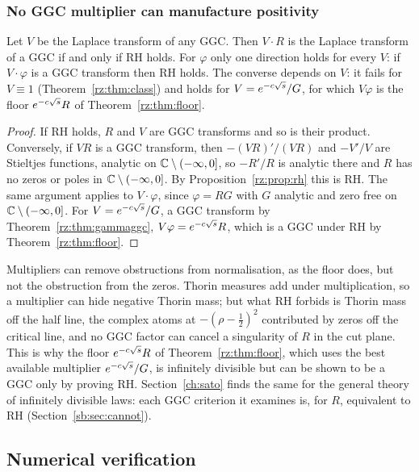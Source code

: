 \subsubsection{No GGC multiplier can manufacture positivity}

\begin{proposition}\label{rz:prop:nomult}
Let $V$ be the Laplace transform of any GGC. Then $V\cdot R$ is the Laplace transform of a GGC if and only if RH holds. For $\varphi$ only one direction holds for every $V$: if $V\cdot\varphi$ is a GGC transform then RH holds. The converse depends on $V$: it fails for $V\equiv1$ (Theorem~\ref{rz:thm:class}) and holds for $V=e^{-c\sqrt{s}}/G$, for which $V\varphi$ is the floor $e^{-c\sqrt{s}}R$ of Theorem~\ref{rz:thm:floor}.
\end{proposition}

\begin{proof}
If RH holds, $R$ and $V$ are GGC transforms and so is their product. Conversely, if $VR$ is a GGC transform, then $-(VR)'/(VR)$ and $-V'/V$ are Stieltjes functions, analytic on $\mathbb{C}\setminus(-\infty,0]$, so $-R'/R$ is analytic there and $R$ has no zeros or poles in $\mathbb{C}\setminus(-\infty,0]$. By Proposition~\ref{rz:prop:rh} this is RH. The same argument applies to $V\cdot\varphi$, since $\varphi=RG$ with $G$ analytic and zero free on $\mathbb{C}\setminus(-\infty,0]$. For $V=e^{-c\sqrt{s}}/G$, a GGC transform by Theorem~\ref{rz:thm:gammaggc}, $V\varphi=e^{-c\sqrt{s}}R$, which is a GGC under RH by Theorem~\ref{rz:thm:floor}.
\end{proof}

Multipliers can remove obstructions from normalisation, as the floor does, but not the obstruction from the zeros. Thorin measures add under multiplication, so a multiplier can hide negative Thorin mass; but what RH forbids is Thorin mass off the half line, the complex atoms at $-(\rho-\frac12)^2$ contributed by zeros off the critical line, and no GGC factor can cancel a singularity of $R$ in the cut plane. This is why the floor $e^{-c\sqrt{s}}R$ of Theorem~\ref{rz:thm:floor}, which uses the best available multiplier $e^{-c\sqrt{s}}/G$, is infinitely divisible but can be shown to be a GGC only by proving RH. Section~\ref{ch:sato} finds the same for the general theory of infinitely divisible laws: each GGC criterion it examines is, for $R$, equivalent to RH (Section~\ref{sb:sec:cannot}).

\subsection{Numerical verification}\label{rz:sec:num}

